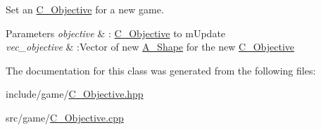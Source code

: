 Set an \hyperlink{classC__Objective}{C\+\_\+\+Objective} for a new game. 


\begin{DoxyParams}{Parameters}
{\em objective} & \+: \hyperlink{classC__Objective}{C\+\_\+\+Objective} to m\+Update \\
\hline
{\em vec\+\_\+objective} & \+:Vector of new \hyperlink{classA__Shape}{A\+\_\+\+Shape} for the new \hyperlink{classC__Objective}{C\+\_\+\+Objective} \\
\hline
\end{DoxyParams}


The documentation for this class was generated from the following files\+:\begin{DoxyCompactItemize}
\item 
include/game/\hyperlink{C__Objective_8hpp}{C\+\_\+\+Objective.\+hpp}\item 
src/game/\hyperlink{C__Objective_8cpp}{C\+\_\+\+Objective.\+cpp}\end{DoxyCompactItemize}
